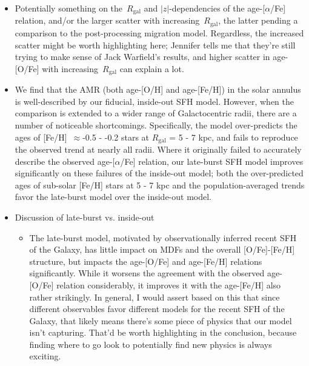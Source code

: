 \documentclass[fleqn, usenatbib]{mnras}
\begin{document}
\begin{itemize}
	\item {\color{red} Potentially something on the~$R_\text{gal}$ and 
	$\left|z\right|$-dependencies of the age-[$\alpha$/Fe] relation, and/or 
	the larger scatter with increasing~$R_\text{gal}$, the latter pending a 
	comparison to the post-processing migration model. Regardless, the 
	increased scatter might be worth highlighting here; Jennifer tells me that 
	they're still trying to make sense of Jack Warfield's results, and higher 
	scatter in age-[O/Fe] with increasing~$R_\text{gal}$ can explain a lot. } 

	\item We find that the AMR (both age-[O/H] and age-[Fe/H]) in the solar 
	annulus is well-described by our fiducial, inside-out SFH model. However, 
	when the comparison is extended to a wider range of Galactocentric radii, 
	there are a number of noticeable shortcomings. Specifically, the model 
	over-predicts the ages of [Fe/H]~$\approx$-0.5 - -0.2 stars at 
	$R_\text{gal}$ = 5 - 7 kpc, and fails to reproduce the observed trend at 
	nearly all radii. Where it originally failed to accurately describe the 
	observed age-[$\alpha$/Fe] relation, our late-burst SFH model improves 
	significantly on these failures of the inside-out model; both the 
	over-predicted ages of sub-solar [Fe/H] stars at 5 - 7 kpc and the 
	population-averaged trends favor the late-burst model over the inside-out 
	model. 

	\item Discussion of late-burst vs. inside-out 
	\begin{itemize} 
		\item The late-burst model, motivated by observationally inferred 
		recent SFH of the Galaxy, has little impact on MDFs and the overall 
		[O/Fe]-[Fe/H] structure, but impacts the age-[O/Fe] and age-[Fe/H] 
		relations significantly. While it worsens the agreement with the 
		observed age-[O/Fe] relation considerably, it improves it with the 
		age-[Fe/H] also rather strikingly. {\color{red} In general, I would 
		assert based on this that since different observables favor different 
		models for the recent SFH of the Galaxy, that likely means there's 
		some piece of physics that our model isn't capturing. That'd be worth 
		highlighting in the conclusion, because finding where to go look to 
		potentially find new physics is always exciting. } 
	\end{itemize} 


\end{itemize}
\end{document}
